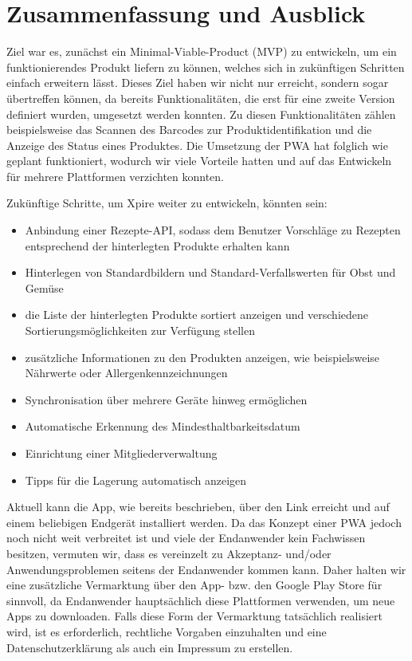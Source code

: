 \chapter{Zusammenfassung und Ausblick}

Ziel war es, zunächst ein Minimal-Viable-Product (MVP) zu entwickeln, um ein funktionierendes Produkt liefern zu können, welches sich in zukünftigen Schritten einfach erweitern lässt. Dieses Ziel haben wir nicht nur erreicht, sondern sogar übertreffen können, da bereits Funktionalitäten, die erst für eine zweite Version definiert wurden, umgesetzt werden konnten. Zu diesen Funktionalitäten zählen beispielsweise das Scannen des Barcodes zur Produktidentifikation und die Anzeige des Status eines Produktes. Die Umsetzung der PWA hat folglich wie geplant funktioniert, wodurch wir viele Vorteile hatten und auf das Entwickeln für mehrere Plattformen verzichten konnten.

Zukünftige Schritte, um Xpire weiter zu entwickeln, könnten sein:
\begin{itemize}[noitemsep]
	\item Anbindung einer Rezepte-API, sodass dem Benutzer Vorschläge zu Rezepten entsprechend der hinterlegten Produkte erhalten kann
	\item Hinterlegen von Standardbildern und Standard-Verfallswerten für Obst und Gemüse
	\item die Liste der hinterlegten Produkte sortiert anzeigen und verschiedene Sortierungsmöglichkeiten zur Verfügung stellen
	\item zusätzliche Informationen zu den Produkten anzeigen, wie beispielsweise Nährwerte oder Allergenkennzeichnungen
	\item Synchronisation über mehrere Geräte hinweg ermöglichen
	\item Automatische Erkennung des Mindesthaltbarkeitsdatum
	\item Einrichtung einer Mitgliederverwaltung
	\item Tipps für die Lagerung automatisch anzeigen
\end{itemize}

Aktuell kann die App, wie bereits beschrieben, über den Link erreicht und auf einem beliebigen Endgerät installiert werden. Da das Konzept einer PWA jedoch noch nicht weit verbreitet ist und viele der Endanwender kein Fachwissen besitzen, vermuten wir, dass es vereinzelt zu Akzeptanz- und/oder Anwendungsproblemen seitens der Endanwender kommen kann. Daher halten wir eine zusätzliche Vermarktung über den App- bzw. den Google Play Store für sinnvoll, da Endanwender hauptsächlich diese Plattformen verwenden, um neue Apps zu downloaden. Falls diese Form der Vermarktung tatsächlich realisiert wird, ist es erforderlich, rechtliche Vorgaben einzuhalten und eine Datenschutzerklärung als auch ein Impressum zu erstellen.

